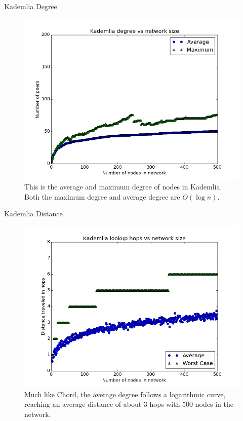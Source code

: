 \documentclass[11pt]{beamer}
\begin{document}
\begin{frame}{Kademlia Degree}
\begin{figure}
	\centering
	\includegraphics[width=0.7\linewidth]{figs/KademliaDegree}
	\caption[Degree of nodes in Kademlia]{This is the average and maximum degree of nodes in Kademlia.  Both the maximum degree and average degree are $O(\log n)$.}
	\label{fig:KademliaDegree}
\end{figure}
\end{frame}

\begin{frame}{Kademlia Distance}
\begin{figure}
	\centering
	\includegraphics[width=0.7\linewidth]{figs/KademliaDistance}
	\caption[Kademlia hops]{Much like Chord, the average degree follows a logarithmic curve, reaching an average distance of about 3 hops with 500 nodes in the network.}
	\label{fig:KademliaDistance}
\end{figure}
\end{frame}
\end{document}
